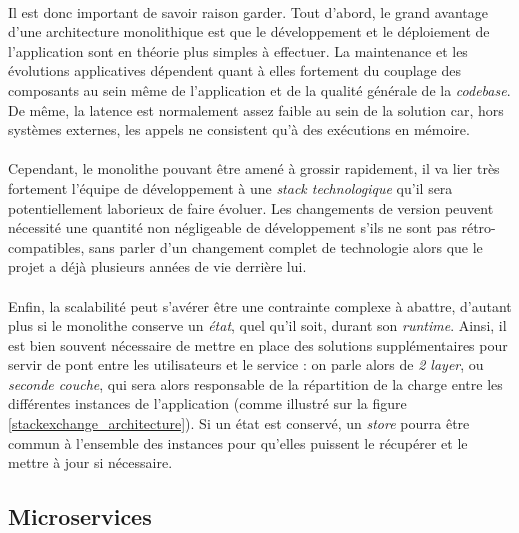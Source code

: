 \paragraph{} Il est donc important de savoir raison garder. Tout d'abord, le grand avantage d'une architecture monolithique
est que le développement et le déploiement de l'application sont en théorie plus simples à effectuer. La maintenance et 
les évolutions applicatives dépendent quant à elles fortement du couplage des composants au sein même de l'application et 
de la qualité générale de la \emph{codebase}. De même, la latence est normalement assez faible au sein de la solution car,
hors systèmes externes, les appels ne consistent qu'à des exécutions en mémoire.

\paragraph{} Cependant, le monolithe pouvant être amené à grossir rapidement, il va lier très fortement l'équipe de développement
à une \emph{stack technologique} qu'il sera potentiellement laborieux de faire évoluer. Les changements de version peuvent 
nécessité une quantité non négligeable de développement s'ils ne sont pas rétro-compatibles, sans parler d'un changement 
complet de technologie alors que le projet a déjà plusieurs années de vie derrière lui.

\paragraph{} Enfin, la scalabilité peut s'avérer être une contrainte complexe à abattre, d'autant plus si le monolithe
conserve un \emph{état}, quel qu'il soit, durant son \emph{runtime}. Ainsi, il est bien souvent nécessaire de mettre en place
des solutions supplémentaires pour servir de pont entre les utilisateurs et le service : on parle alors de \emph{2 layer},
ou \emph{seconde couche}, qui sera alors responsable de la répartition de la charge entre les différentes instances de l'application
(comme illustré sur la figure \ref{stackexchange_architecture}). Si un état est conservé, un \emph{store} pourra être commun
à l'ensemble des instances pour qu'elles puissent le récupérer et le mettre à jour si nécessaire.


\subsection*{Microservices}

